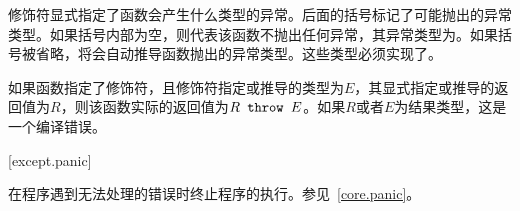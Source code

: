 \pnum
{}修饰符显式指定了函数会产生什么类型的异常。后面的括号标记了可能抛出的异常类型。如果括号内部为空，则代表该函数不抛出任何异常，其异常类型为。如果括号被省略，将会自动推导函数抛出的异常类型。这些类型必须实现了。

\pnum
如果函数指定了修饰符，且修饰符指定或推导的类型为$E$，其显式指定或推导的返回值为$R$，则该函数实际的返回值为$R\texttt{ throw }E$。如果$R$或者$E$为结果类型，这是一个编译错误。

[except.panic]{}

\pnum
{}在程序遇到无法处理的错误时终止程序的执行。参见~\ref{core.panic}。